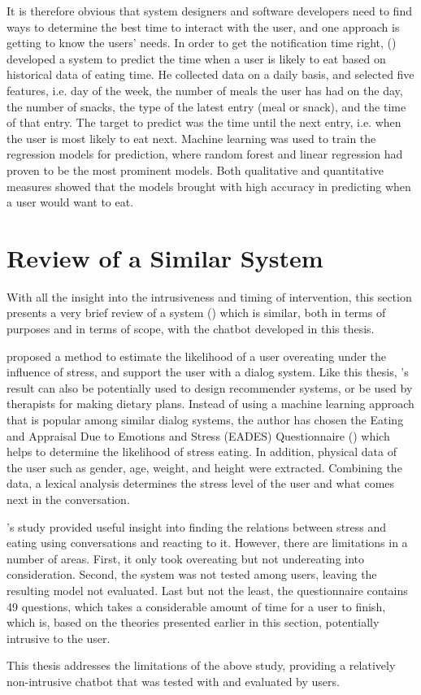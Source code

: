 \noindent It is therefore obvious that system designers and software developers need to find ways to determine the best time to interact with the user, and one approach is getting to know the users' needs. In order to get the notification time right, \citeauthor{27_oguz} (\citeyear{27_oguz}) developed a system to predict the time when a user is likely to eat based on historical data of eating time. He collected data on a daily basis, and selected five features, i.e. day of the week, the number of meals the user has had on the day, the number of snacks, the type of the latest entry (meal or snack), and the time of that entry. The target to predict was the time until the next entry, i.e. when the user is most likely to eat next. Machine learning was used to train the regression models for prediction, where random forest and linear regression had proven to be the most prominent models. Both qualitative and quantitative measures showed that the models brought with high accuracy in predicting when a user would want to eat.

\section{Review of a Similar System}
With all the insight into the intrusiveness and timing of intervention, this section presents a very brief review of a system (\cite{31_marija}) which is similar, both in terms of purposes and in terms of scope, with the chatbot developed in this thesis.

\citeauthor{31_marija} proposed a method to estimate the likelihood of a user overeating under the influence of stress, and support the user with a dialog system. Like this thesis, \citeauthor{31_marija}'s result can also be potentially used to design recommender systems, or be used by therapists for making dietary plans. Instead of using a machine learning approach that is popular among similar dialog systems, the author has chosen the Eating and Appraisal Due to Emotions and Stress (EADES) Questionnaire (\cite{33_eades}) which helps to determine the likelihood of stress eating. In addition, physical data of the user such as gender, age, weight, and height were extracted. Combining the data, a lexical analysis determines the stress level of the user and what comes next in the conversation.

\citeauthor{31_marija}'s study provided useful insight into finding the relations between stress and eating using conversations and reacting to it. However, there are limitations in a number of areas. First, it only took overeating but not undereating into consideration. Second, the system was not tested among users, leaving the resulting model not evaluated. Last but not the least, the questionnaire contains 49 questions, which takes a considerable amount of time for a user to finish, which is, based on the theories presented earlier in this section, potentially intrusive to the user.\bigskip

\noindent This thesis addresses the limitations of the above study, providing a relatively non-intrusive chatbot that was tested with and evaluated by users.
